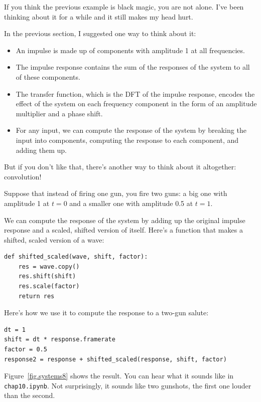 \documentclass[12pt]{book}
\begin{document}
If you think the previous example is black magic,
you are not alone.  I've been thinking about it for a while and it
still makes my head hurt.

In the previous section, I suggested one way to think about it:

\begin{itemize}

\item An impulse is made up of components with amplitude 1 at all
  frequencies.

\item The impulse response contains the sum of the responses of the
  system to all of these components.

\item The transfer function, which is the DFT of the impulse response,
  encodes the effect of the system on each frequency component in the form
  of an amplitude multiplier and a phase shift.

\item For any input, we can compute the response of the system
  by breaking the input into components, computing the response to
  each component, and adding them up.

\end{itemize}

But if you don't like that, there's another way to think about
it altogether: convolution!

Suppose that instead of firing one gun, you fire two guns:
a big one with amplitude 1 at $t=0$ and a smaller one with
amplitude 0.5 at $t=1$.

We can compute the response of the system by adding up
the original impulse response and a scaled, shifted version of itself.
Here's a function that makes a shifted, scaled version of
a wave:

\begin{verbatim}
def shifted_scaled(wave, shift, factor):
    res = wave.copy()
    res.shift(shift)
    res.scale(factor)
    return res
\end{verbatim}

Here's how we use it to compute the response to a two-gun salute:

\begin{verbatim}
dt = 1
shift = dt * response.framerate
factor = 0.5
response2 = response + shifted_scaled(response, shift, factor)
\end{verbatim}

Figure~\ref{fig.systems8} shows the result.  You can hear what
it sounds like in {\tt chap10.ipynb}.  Not surprisingly, it
sounds like two gunshots, the first one louder than the second.
\end{document}
